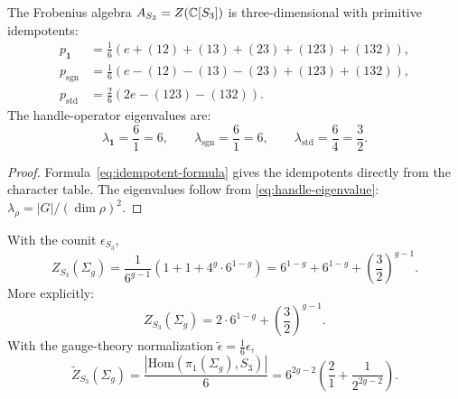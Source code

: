 \begin{proposition}\label{prop:handle-S3}
The Frobenius algebra $A_{S_3} = Z(\mathbb{C}[S_3])$ is three-dimensional with primitive idempotents:
\begin{align}
p_{\mathbf{1}} &= \frac{1}{6}(e + (12) + (13) + (23) + (123) + (132)), \label{eq:S3-p-trivial} \\[1mm]
p_{\mathrm{sgn}} &= \frac{1}{6}(e - (12) - (13) - (23) + (123) + (132)), \label{eq:S3-p-sign} \\[1mm]
p_{\mathrm{std}} &= \frac{2}{6}(2e - (123) - (132)). \label{eq:S3-p-std}
\end{align}
The handle-operator eigenvalues are:
\begin{equation}\label{eq:S3-eigenvalues}
\lambda_{\mathbf{1}} = \frac{6}{1} = 6, \qquad
\lambda_{\mathrm{sgn}} = \frac{6}{1} = 6, \qquad
\lambda_{\mathrm{std}} = \frac{6}{4} = \frac{3}{2}.
\end{equation}
\end{proposition}

\begin{proof}
Formula~\eqref{eq:idempotent-formula} gives the idempotents directly from the character table. The eigenvalues follow from \eqref{eq:handle-eigenvalue}: $\lambda_\rho = |G|/(\dim \rho)^2$.
\end{proof}

\begin{proposition}\label{prop:S3-genus-g}
With the counit $\epsilon_{S_3}$,
\begin{equation}\label{eq:S3-partition}
Z_{S_3}(\Sigma_g) = \frac{1}{6^{g-1}}\left(1 + 1 + 4^g \cdot 6^{1-g}\right) = 6^{1-g} + 6^{1-g} + \left(\frac{3}{2}\right)^{g-1}.
\end{equation}
More explicitly:
\begin{equation}\label{eq:S3-partition-explicit}
Z_{S_3}(\Sigma_g) = 2 \cdot 6^{1-g} + \left(\frac{3}{2}\right)^{g-1}.
\end{equation}
With the gauge-theory normalization $\widetilde{\epsilon} = \frac{1}{6}\epsilon$,
\begin{equation}\label{eq:S3-gauge-partition}
\widetilde{Z}_{S_3}(\Sigma_g) = \frac{|\mathrm{Hom}(\pi_1(\Sigma_g), S_3)|}{6} = 6^{2g-2}\left(\frac{2}{1} + \frac{1}{2^{2g-2}}\right).
\end{equation}
\end{proposition}

